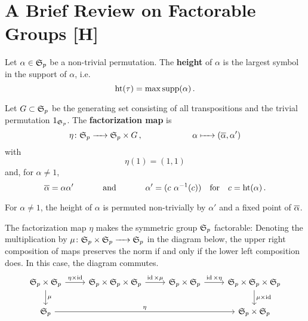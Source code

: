 \section{A Brief Review on Factorable Groups [H]}
\label{notation:factorable_groups}

\begin{defi}
    \label{notation:height}
    Let $\alpha \in \Symgrp_p$ be a non-trivial permutation.
    The \textbf{height} of $\alpha$ is the largest symbol in the support of $\alpha$, i.e.\ 
    \[
        \height(\tau) = \max \supp(\alpha) \,.
    \]
\end{defi}

\begin{defi}
    \label{notation:factorization_map}
    Let $G \subset \SymGr_p$ be the generating set consisting of all transpositions and the trivial permutation $1_{\SymGr_p}$.
    The {\bf factorization map} is
    \[
        \eta \colon \SymGr_p \to \SymGr_p \times G\,, \mspc{}{30} \alpha \mapsto (\ov\alpha, \alpha') 
    \]
    with
    \[
        \eta(1) = (1,1)
    \]
    and, for $\alpha \neq 1$,
    \[
        \ov\alpha = \alpha \alpha' \mspc{and}{35} \alpha' = (c\ \alpha^{-1}(c)) \mspc{for}{10} c = \hgt(\alpha) \,.
    \]
\end{defi}

\begin{rem}
    \label{notation:height_rem}
    For $\alpha \neq 1$, the height of $\alpha$ is permuted non-trivially by $\alpha'$ and a fixed point of $\ov\alpha$.
\end{rem}

\begin{thm*}
    The factorization map $\eta$ makes the symmetric group $\Symgrp_p$ factorable:
    Denoting the multiplication by $\mu \colon \SymGr_p \times \SymGr_p \to \SymGr_p$ in the diagram below,
    the upper right composition of maps preserves the norm if and only if the lower left composition does.
    In this case, the diagram commutes.
    \[
        \begin{tikzcd}
            \SymGr_p \times \SymGr_p  \arrow{d}{\mu} \arrow{r}{\eta \times \id} & \SymGr_p \times \SymGr_p \times \SymGr_p \arrow{r}{\id \times \mu}    & \SymGr_p \times \SymGr_p \arrow{r}{\id \times \eta}   & \SymGr_p \times \SymGr_p \times \SymGr_p \arrow{d}{\mu \times \id} \\
            \SymGr_p \arrow{rrr}{\eta}                                          &                                                                       &                                                       & \SymGr_p \times \SymGr_p
        \end{tikzcd}
    \]
\end{thm*}

